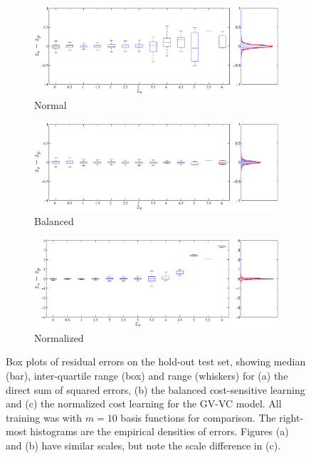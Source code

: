 \documentclass[useAMS,usenatbib,fleqn]{mn2e}
\begin{document}
\begin{figure}
        \centering
        \begin{subfigure}[b]{\columnwidth}
                \includegraphics[width=\textwidth]{figures/Zspec-Zphot_normal.eps}
                \caption{Normal}
                \label{fig-normal}
        \end{subfigure}	
        \begin{subfigure}[b]{\columnwidth}
                \includegraphics[width=\textwidth]{figures/Zspec-Zphot_balanced.eps}
                \caption{Balanced}
                \label{fig-balanced}
        \end{subfigure}
       \begin{subfigure}[b]{\columnwidth}
                \includegraphics[width=\textwidth]{figures/Zspec-Zphot_normalised.eps}
                \caption{Normalized}
                \label{fig-normalized}
        \end{subfigure}
       \caption{Box plots of residual errors on the hold-out test set, showing median (bar), inter-quartile range (box) and range (whiskers) for (a) the direct sum of squared errors, (b) the balanced cost-sensitive learning and (c) the normalized cost learning for the GV-VC model. All training was with $m=10$ basis functions for comparison. The right-most histograms are the empirical densities of errors. Figures (a) and (b) have similar scales, but note the scale difference in (c).}
	\label{fig-normal-balanced}
\end{figure}
\end{document}
